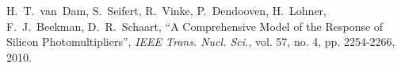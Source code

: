\documentclass[journal]{IEEEtran}
\begin{document}
\begin{thebibliography}{1}
H.~T.~van~Dam, S.~Seifert, R.~Vinke, P.~Dendooven, H.~Lohner, F.~J.~Beekman, D.~R.~Schaart, ``A Comprehensive Model of the Response of Silicon Photomultipliers'', \emph{IEEE Trans. Nucl. Sci.}, vol. 57, no. 4, pp. 2254-2266, 2010.




\end{thebibliography}
\end{document}
